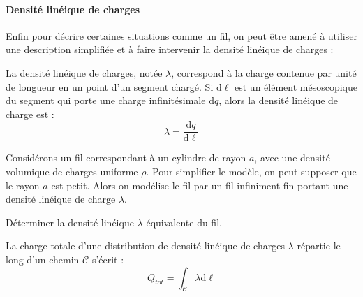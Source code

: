 \documentclass[11pt,fleqn]{book} %
\newcommand{\dd}{\mathrm{d}}
\begin{document}
\paragraph{Densité linéique de charges}

Enfin pour décrire certaines situations comme un fil, on peut être amené à utiliser une description simplifiée et à faire intervenir la densité linéique de charges :
\begin{definition}
    La densité linéique de charges, notée $\lambda$, correspond à la charge contenue par unité de longueur en un point d'un segment chargé. Si $\dd \ell$ est un élément mésoscopique du segment qui porte une charge infinitésimale $\dd q$, alors la densité linéique de charge est :
    \begin{equation}
        \lambda = \frac{\dd q}{\dd \ell}
    \end{equation}
\end{definition}

\begin{capex}
Considérons un fil correspondant à un cylindre de rayon $a$, avec une densité volumique de charges uniforme $\rho$. Pour simplifier le modèle, on peut supposer que le rayon $a$ est petit. Alors on modélise le fil par un fil infiniment fin portant une densité linéique de charge $\lambda$.

Déterminer la densité linéique $\lambda$ équivalente du fil.
\end{capex} 


\begin{proposition}
    La charge totale d'une distribution de densité linéique de charges $\lambda$ répartie le long d'un chemin $\mathcal{C}$ s'écrit :
    \begin{equation}
        Q_{tot} = \int_{\mathcal{C}} \lambda \dd \ell
    \end{equation}
\end{proposition}
\end{document}
